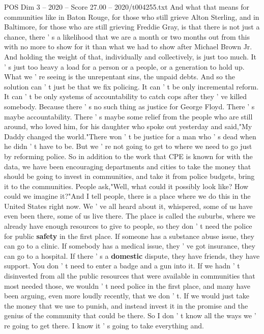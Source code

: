 \begin{textsample}{POS Dim 3 – 2020 – Score 27.00 – 2020/t004255.txt}
And what that means for communities like in Baton Rouge, for those who still grieve Alton Sterling, and in Baltimore, for those who are still grieving Freddie Gray, is that there is not just a chance, there ' s a likelihood that we are a month or two months out from this with no more to show for it than what we had to show after Michael Brown Jr.
And holding the weight of that, individually and collectively, is just too much.
It ' s just too heavy a load for a person or a people, or a generation to hold up.
What we ' re seeing is the unrepentant sins, the unpaid debts.
And so the solution can ' t just be that we fix policing.
It can ' t be only incremental reform.
It can ' t be only systems of accountability to catch cops after they ' ve killed somebody.
Because there ' s no such thing as justice for George Floyd.
There ' s maybe accountability.
There ' s maybe some relief from the people who are still around, who loved him, for his daughter who spoke out yesterday and said,"My Daddy changed the world."There won ' t be justice for a man who ' s dead when he didn ' t have to be.
But we ' re not going to get to where we need to go just by reforming police.
So in addition to the work that CPE is known for with the data, we have been encouraging departments and cities to take the money that should be going to invest in communities, and take it from police budgets, bring it to the communities.
People ask,"Well, what could it possibly look like?
How could we imagine it?"And I tell people, there is a place where we do this in the United States right now.
We ' ve all heard about it, whispered, some of us have even been there, some of us live there.
The place is called the suburbs, where we already have enough resources to give to people, so they don ' t need the police for public \textbf{safety} in the first place.
If someone has a substance abuse issue, they can go to a clinic.
If somebody has a medical issue, they ' ve got insurance, they can go to a hospital.
If there ' s a \textbf{domestic} dispute, they have friends, they have support.
You don ' t need to enter a badge and a gun into it.
If we hadn ' t disinvested from all the public resources that were available in communities that most needed those, we wouldn ' t need police in the first place, and many have been arguing, even more loudly recently, that we don ' t.
If we would just take the money that we use to punish, and instead invest it in the promise and the genius of the community that could be there.
So I don ' t know all the ways we ' re going to get there.
I know it ' s going to take everything and.

\end{textsample}
